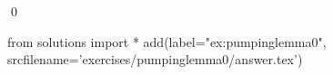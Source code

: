 
\begin{ex} 
  \label{ex:pumpinglemma0}
  
  \qed
\end{ex} 
\begin{python0}
from solutions import *
add(label="ex:pumpinglemma0",
    srcfilename='exercises/pumpinglemma0/answer.tex') 
\end{python0}
